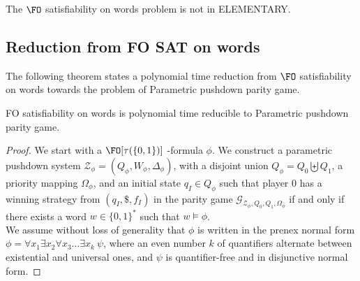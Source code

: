 \documentclass[a4paper,UKenglish,cleveref, autoref, thm-restate]{lipics-v2021}
\begin{document}
{\begin{theorem}
The {\sc $\FO$ satisfiability on words} problem is not in {\sc ELEMENTARY}.
\end{theorem}





\subsection{Reduction from FO SAT on words}

The following theorem states a polynomial time reduction from
{\sc $\FO$ satisfiability on words}
towards the problem of %
{\sc Parametric pushdown parity game}.




\begin{samepage}
\begin{theorem}
{\sc FO satisfiability on words} is polynomial time reducible to {\sc Parametric pushdown parity game}.
\end{theorem}
\end{samepage}



\begin{proof}

\noindent
We start with
 a 
 $\FO[\tau(\{0,1\})]$%
-formula $\phi$.
%
%
We construct
a parametric pushdown system $\mathcal{Z}_\phi = (Q_\phi,W_\phi, \Delta_\phi )$, with a disjoint
union $Q_\phi = Q_0  \biguplus Q_1 $, a priority mapping $\Omega_\phi$, and an initial state $q_I \in Q_\phi$
such that
player $0$ has a winning strategy from $(q_I, \$, f_I)$ in the  parity game
$\mathcal{G}_{\mathcal{Z_\phi}, Q_0,Q_1, \Omega_\phi}$
if and only if
there exists a word $w \in \{0,1\}^*$ such that
$w  \models \phi $. \\

\noindent
We assume without loss of generality that $\phi$ is written in the prenex normal form
$\phi = \forall x_1 \exists x_2 \forall x_3 \ldots \exists x_k ~ \psi$, where 
an even number $k$ of quantifiers alternate between existential and universal ones, and 
$\psi$ is quantifier-free and in disjunctive normal form.







\end{proof}}
\end{document}
